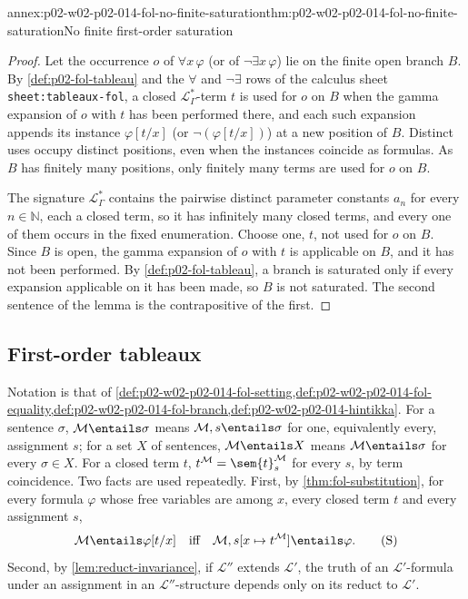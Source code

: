 \begin{annexitem}{annex:p02-w02-p02-014-fol-no-finite-saturation}{thm:p02-w02-p02-014-fol-no-finite-saturation}{No finite first-order saturation}
\begin{proof}
Let the occurrence \(o\) of \(\forall x\,\varphi\) (or of
\(\neg\exists x\,\varphi\)) lie on the finite open branch \(B\).  By
\cref{def:p02-fol-tableau} and the \(\forall\) and \(\neg\exists\) rows of the calculus
sheet \texttt{sheet:\allowbreak tableaux-fol}, a closed
\(\mathcal L_{\Gamma}^{*}\)-term \(t\) is used for \(o\) on \(B\) when the
gamma expansion of \(o\) with \(t\) has been performed there, and each such
expansion appends its instance \(\varphi[t/x]\) (or
\(\neg(\varphi[t/x])\)) at a new position of \(B\).  Distinct uses occupy
distinct positions, even when the instances coincide as formulas.  As \(B\)
has finitely many positions, only finitely many terms are used for \(o\) on
\(B\).

The signature \(\mathcal L_{\Gamma}^{*}\) contains the pairwise distinct
parameter constants \(a_n\) for every \(n\in\mathbb N\), each a closed term,
so it has infinitely many closed terms, and every one of them occurs in the
fixed enumeration.  Choose one, \(t\), not used for \(o\) on \(B\).  Since
\(B\) is open, the gamma expansion of \(o\) with \(t\) is applicable on \(B\),
and it has not been performed.  By \cref{def:p02-fol-tableau}, a branch is
saturated only if every expansion applicable on it has been made, so \(B\) is not
saturated.  The second sentence of the lemma is the contrapositive of the
first.
\end{proof}
\end{annexitem}

\subsection{First-order tableaux}
\label{sec:annex-p02-w02-p02-014-fol}

Notation is that of
\cref{def:p02-w02-p02-014-fol-setting,def:p02-w02-p02-014-fol-equality,def:p02-w02-p02-014-fol-branch,def:p02-w02-p02-014-hintikka}.
For a sentence \(\sigma\), \(\mathcal M\entails\sigma\) means
\(\mathcal M,s\entails\sigma\) for one, equivalently every, assignment \(s\);
for a set \(X\) of sentences, \(\mathcal M\entails X\) means
\(\mathcal M\entails\sigma\) for every \(\sigma\in X\).  For a closed term
\(t\), \(t^{\mathcal M}=\sem{t}^{\mathcal M}_s\) for every \(s\), by term
coincidence.  Two facts are used repeatedly.  First, by
\cref{thm:fol-substitution}, for every formula \(\varphi\) whose free
variables are among \(x\), every closed term \(t\) and every assignment \(s\),
\[
  \mathcal M\entails\varphi[t/x]
  \quad\text{iff}\quad
  \mathcal M,s[x\mapsto t^{\mathcal M}]\entails\varphi .
  \tag{S}
\]
Second, by \cref{lem:reduct-invariance}, if \(\mathcal L''\) extends
\(\mathcal L'\), the truth of an \(\mathcal L'\)-formula under an assignment
in an \(\mathcal L''\)-structure depends only on its reduct to
\(\mathcal L'\).

